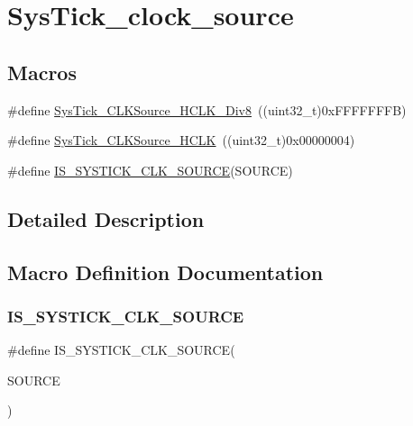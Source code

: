 \hypertarget{group___sys_tick__clock__source}{}\section{Sys\+Tick\+\_\+clock\+\_\+source}
\label{group___sys_tick__clock__source}
\subsection*{Macros}
\begin{DoxyCompactItemize}
\item 
\#define \mbox{\hyperlink{group___sys_tick__clock__source_ga545c387ce43db90f15faad5f354f890d}{Sys\+Tick\+\_\+\+C\+L\+K\+Source\+\_\+\+H\+C\+L\+K\+\_\+\+Div8}}~((uint32\+\_\+t)0x\+F\+F\+F\+F\+F\+F\+F\+B)
\item 
\#define \mbox{\hyperlink{group___sys_tick__clock__source_ga8a885ce2632ad4c35e229bb7c6e60191}{Sys\+Tick\+\_\+\+C\+L\+K\+Source\+\_\+\+H\+C\+LK}}~((uint32\+\_\+t)0x00000004)
\item 
\#define \mbox{\hyperlink{group___sys_tick__clock__source_ga22d6291f6aed29442cf4cd9098fa0784}{I\+S\+\_\+\+S\+Y\+S\+T\+I\+C\+K\+\_\+\+C\+L\+K\+\_\+\+S\+O\+U\+R\+CE}}(S\+O\+U\+R\+CE)
\end{DoxyCompactItemize}


\subsection{Detailed Description}


\subsection{Macro Definition Documentation}
\mbox{\label{group___sys_tick__clock__source_ga22d6291f6aed29442cf4cd9098fa0784}} 
\subsubsection{\texorpdfstring{IS\_SYSTICK\_CLK\_SOURCE}{IS\_SYSTICK\_CLK\_SOURCE}}
{\footnotesize\ttfamily \#define I\+S\+\_\+\+S\+Y\+S\+T\+I\+C\+K\+\_\+\+C\+L\+K\+\_\+\+S\+O\+U\+R\+CE(\begin{DoxyParamCaption}\item[{}]{S\+O\+U\+R\+CE }\end{DoxyParamCaption})}

